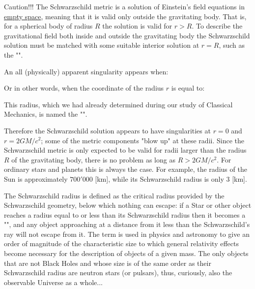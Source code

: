 	Caution!!! The Schwarzschild metric is a solution of Einstein's field equations in \underline{empty space}, meaning that it is valid only outside the gravitating body. That is, for a spherical body of radius $R$ the solution is valid for $r > R$. To describe the gravitational field both inside and outside the gravitating body the Schwarzschild solution must be matched with some suitable interior solution at $r = R$, such as the "".

	An all (physically) apparent singularity appears when:
	
	Or in other words, when the coordinate of the radius $r$ is equal to:
	
	This radius, which we had already determined during our study of Classical Mechanics, is named the "\label{schwarzschild radius}".

	Therefore the Schwarzschild solution appears to have singularities at $r = 0$ and $r = 2GM/c^2$; some of the metric components "blow up" at these radii. Since the Schwarzschild metric is only expected to be valid for radii larger than the radius $R$ of the gravitating body, there is no problem as long as $R > 2GM/c^2$. For ordinary stars and planets this is always the case. For example, the radius of the Sun is approximately $700'000$ [km], while its Schwarzschild radius is only $3$ [km].
	
	The Schwarzschild radius is defined as the critical radius provided by the Schwarzschild geometry, below which nothing can escape: if a Star or other object reaches a radius equal to or less than its Schwarzschild radius then it becomes a "", and any object approaching at a distance from it less than the Schwarzschild's ray will not escape from it. The term is used in physics and astronomy to give an order of magnitude of the characteristic size to which general relativity effects become necessary for the description of objects of a given mass. The only objects that are not Black Holes and whose size is of the same order as their Schwarzschild radius are neutron stars (or pulsars), thus, curiously, also the observable Universe as a whole...
	

